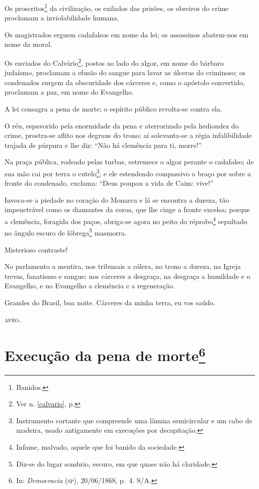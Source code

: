 Os proscritos\footnote{Banidos.} da civilização, os exilados das
prisões, os obreiros do crime proclamam a inviolabilidade humana.

Os magistrados erguem cadafalsos em nome da lei; os assassinos
abatem-nos em nome da moral.

Os enviados do Calvário\footnote{Ver n. \ref{calvario}, p. \pageref{calvario}}, 
postos ao lado do algoz, em nome do bárbaro judaísmo,
proclamam a efusão do sangue para lavar as úlceras do criminoso; os
condenados surgem da obscuridade dos cárceres e, como o apóstolo
convertido, proclamam a paz, em nome do Evangelho.

A lei consagra a pena de morte; o espírito público revolta-se contra
ela.

O réu, espavorido pela enormidade da pena e aterrorizado pela hediondez
do crime, prostra-se aflito nos degraus do trono; aí solevanta-se a
régia infalibilidade trajada de púrpura e lhe diz: ``Não há clemência
para ti, morre!''

Na praça pública, rodeado pelas turbas, estremece o algoz perante o
cadafalso; de sua mão cai por terra o cutelo\footnote{Instrumento
  cortante que compreende uma lâmina semicircular e um cabo de madeira,
  usado antigamente em execuções por decapitação.}; e ele estendendo
compassivo o braço por sobre a fronte do condenado, exclama: ``Deus
poupou a vida de Caim: vive!''

Invoca-se a piedade no coração do Monarca e lá se encontra a dureza, tão
impenetrável como os diamantes da coroa, que lhe cinge a fronte excelsa;
porque a clemência, foragida dos paços, abriga-se agora no peito do
réprobo\footnote{Infame, malvado, aquele que foi banido da sociedade.}
sepultado no ângulo escuro de lôbrega\footnote{Diz-se do lugar
  sombrio, escuro, em que quase não há claridade.} masmorra.

Misterioso contraste!

No parlamento a mentira, nos tribunais a cólera, no trono a dureza, na
Igreja trevas, fanatismo e sangue; nos cárceres a desgraça, na desgraça
a humildade e o Evangelho, e no Evangelho a clemência e a regeneração.

Grandes do Brasil, boa noite. Cárceres da minha terra, eu vos saúdo.
\begin{flushright}
\textsc{afro}.
\end{flushright}

\chapter{Execução da pena de morte\footnote{In: \emph{Democracia} (\textsc{sp}),
  20/06/1868, p.~4. S/A.}}

